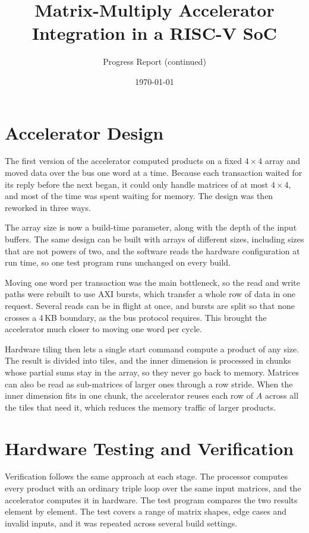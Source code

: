 \documentclass[10pt]{article}
\title{\vspace{-1.5em}Matrix-Multiply Accelerator Integration in a RISC-V SoC\vspace{-0.5em}}
\author{Progress Report (continued)}
\date{\vspace{-1em}\today}
\begin{document}
\maketitle
\vspace{-1em}

\section*{Accelerator Design}
The first version of the accelerator computed products on a fixed $4\times4$ array and
moved data over the bus one word at a time. Because each transaction waited for its reply
before the next began, it could only handle matrices of at most $4\times4$, and most of
the time was spent waiting for memory. The design was then reworked in three ways.

The array size is now a build-time parameter, along with the depth of the input buffers.
The same design can be built with arrays of different sizes, including sizes that are not
powers of two, and the software reads the hardware configuration at run time, so one test
program runs unchanged on every build.

Moving one word per transaction was the main bottleneck, so the read and write paths were
rebuilt to use AXI bursts, which transfer a whole row of data in one request. Several reads
can be in flight at once, and bursts are split so that none crosses a 4\,KB boundary, as the
bus protocol requires. This brought the accelerator much closer to moving one word per
cycle.

Hardware tiling then lets a single start command compute a product of any size. The result
is divided into tiles, and the inner dimension is processed in chunks whose partial sums stay
in the array, so they never go back to memory. Matrices can also be read as sub-matrices of
larger ones through a row stride. When the inner dimension fits in one chunk, the accelerator
reuses each row of $A$ across all the tiles that need it, which reduces the memory traffic of
larger products.

\section*{Hardware Testing and Verification}
Verification follows the same approach at each stage. The processor computes every product
with an ordinary triple loop over the same input matrices, and the accelerator computes it in
hardware. The test program compares the two results element by element. The test covers a range of matrix shapes, edge cases and invalid inputs, and it was repeated
across several build settings.
\end{document}
